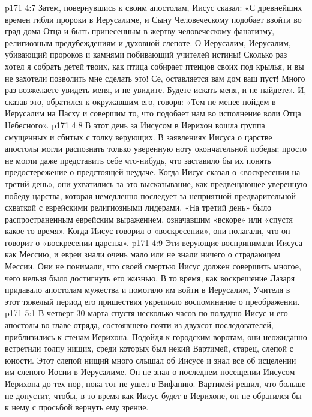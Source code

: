 \vs p171 4:7 Затем, повернувшись к своим апостолам, Иисус сказал: «С древнейших времен гибли пророки в Иерусалиме, и Сыну Человеческому подобает взойти во град дома Отца и быть принесенным в жертву человеческому фанатизму, религиозным предубеждениям и духовной слепоте. О Иерусалим, Иерусалим, убивающий пророков и камнями побивающий учителей истины! Сколько раз хотел я собрать детей твоих, как птица собирает птенцов своих под крылья, и вы не захотели позволить мне сделать это! Се, оставляется вам дом ваш пуст! Много раз возжелаете увидеть меня, и не увидите. Будете искать меня, и не найдете». И, сказав это, обратился к окружавшим его, говоря: «Тем не менее пойдем в Иерусалим на Пасху и совершим то, что подобает нам во исполнение воли Отца Небесного».
\vs p171 4:8 \pc В этот день за Иисусом в Иерихон вошла группа смущенных и сбитых с толку верующих. В заявлениях Иисуса о царстве апостолы могли распознать только уверенную ноту окончательной победы; просто не могли даже представить себе что\hyp{}нибудь, что заставило бы их понять предостережение о предстоящей неудаче. Когда Иисус сказал о «воскресении на третий день», они ухватились за это высказывание, как предвещающее уверенную победу царства, которая немедленно последует за неприятной предварительной схваткой с еврейскими религиозными лидерами. «На третий день» было распространенным еврейским выражением, означавшим «вскоре» или «спустя какое\hyp{}то время». Когда Иисус говорил о «воскресении», они полагали, что он говорит о «воскресении царства».
\vs p171 4:9 Эти верующие воспринимали Иисуса как Мессию, и евреи знали очень мало или не знали ничего о страдающем Мессии. Они не понимали, что своей смертью Иисус должен совершить многое, чего нельзя было достигнуть его жизнью. В то время, как воскрешение Лазаря придавало апостолам мужества и помогало им войти в Иерусалим, Учителя в этот тяжелый период его пришествия укрепляло воспоминание о преображении.
\vs p171 5:1 В четверг 30 марта спустя несколько часов по полудню Иисус и его апостолы во главе отряда, состоявшего почти из двухсот последователей, приблизились к стенам Иерихона. Подойдя к городским воротам, они неожиданно встретили толпу нищих, среди которых был некий Вартимей, старец, слепой с юности. Этот слепой нищий много слышал об Иисусе и знал все об исцелении им слепого Иосии в Иерусалиме. Он не знал о последнем посещении Иисусом Иерихона до тех пор, пока тот не ушел в Вифанию. Вартимей решил, что больше не допустит, чтобы, в то время как Иисус будет в Иерихоне, он не обратился бы к нему с просьбой вернуть ему зрение.

